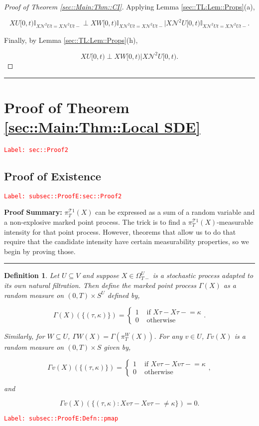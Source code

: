 \documentclass[12pt]{article}
\newcommand{\mb}{\mathbb}
\newcommand{\mc}{\mathcal}
\newcommand{\te}{\text}
\newcommand{\tr}{\textcolor{red}}
\newcommand{\labe}[1]{\tr{\texttt{Label: #1}}}
\newcommand{\pfsum}{\textbf{Proof Summary: }}
\newcommand{\lin}{\rule{\linewidth}{0.4 pt}}
\renewcommand{\v}{v}							%
\renewcommand{\U}{U}							%
\newcommand{\UU}{W}								%
\renewcommand{\S}{S}							%
\newcommand{\T}{T}								%
\renewcommand{\t}{t}							%
\newcommand{\sset}{\Omega}						%
\newcommand{\proj}{\pi}							%
\newcommand{\X}{X}								%
\newcommand{\dneigh}{\mc{N}^2}					%
\newcommand{\carp}[1]{^{#1}}					%
\newcommand{\vsi}[1]{^{#1}}						%
\newcommand{\ts}[1]{_{#1}}						%
\newcommand{\tree}{\mc{T}}						%
\newcommand{\rt}{\tau}							%
\newcommand{\pmap}{\Gamma}						%
\renewcommand{\mark}{\kappa}					%
\newtheorem{defn}[thms]{Definition}
\begin{document}
\begin{proof}[Proof of Theorem \ref{sec::Main:Thm::CI}]
Applying Lemma \ref{sec::TL:Lem::Props}(a),

\[\X{\U}{[0,\t)}\mb{I}_{\X{\dneigh{\U}}{\t} = \X{\dneigh{\U}}{\t-}}\perp\X{\UU}{[0,\t)}\mb{I}_{\X{\dneigh{\U}}{\t} = \X{\dneigh{\U}}{\t-}}\big|\X{\dneigh{\U}}{[0,\t)}\mb{I}_{\X{\dneigh{\U}}{\t} = \X{\dneigh{\U}}{\t-}}.\]

Finally, by Lemma \ref{sec::TL:Lem::Props}(h),

\[\X{\U}{[0,\t)}\perp\X{\UU}{[0,\t)}\big|\X{\dneigh{\U}}{[0,\t)}.\]
\end{proof}

\lin

\section{Proof of Theorem \ref{sec::Main:Thm::Local SDE}}
\label{sec::Proof2}\labe{sec::Proof2}

\subsection{Proof of Existence}
\label{subsec::ProofE:sec::Proof2}\labe{subsec::ProofE:sec::Proof2}

\pfsum \(\proj\vsi{\tree{1}}\ts{\T}(\X{}{})\) can be expressed as a sum of a random variable and a non-explosive marked point process. The trick is to find a \(\proj\vsi{\tree{1}}\ts{\T}(\X{}{})\)-measurable intensity for that point process. However, theorems that allow us to do that require that the candidate intensity have certain measurability properties, so we begin by proving those.

\lin

\begin{defn}
Let \(\U\subseteq V\) and suppose \(\X{}{} \in \sset\vsi{\U}\ts{\T-}\) is a stochastic process adapted to its own natural filtration. Then define the marked point process \(\pmap{}(\X{}{})\) as a random measure on \((0,\T) \times \S\carp{\U}\) defined by,

\[\pmap{}(\X{}{})(\{(\rt{},\mark{})\}) = \begin{cases}
1 &\te{ if } \X{}{\rt{}} - \X{}{\rt{}-} = \mark{}\\
0 &\te{ otherwise}
\end{cases}.\]

Similarly, for \(\UU \subseteq \U\), \(\pmap{\UU}(\X{}{}) = \pmap{}\left(\proj\vsi{\UU}\ts{\T}(\X{}{})\right)\). For any \(\v\in \U\), \(\pmap{\v}(\X{}{})\) is a random measure on \((0,\T) \times \S\) given by,

\[\pmap{\v}(\X{}{})(\{(\rt{},\mark{})\}) = \begin{cases}
1 &\te{ if } \X{\v}{\rt{}} - \X{\v}{\rt{}-} = \mark{}\\
0 &\te{ otherwise}
\end{cases},\]

and

\[\pmap{\v}(\X{}{})(\{(\rt{},\mark{}): \X{\v}{\rt{}} - \X{\v}{\rt{}-} \neq \mark{}\}) = 0.\]
\label{subsec::ProofE:Defn::pmap}
\end{defn}
\labe{subsec::ProofE:Defn::pmap}
\end{document}
